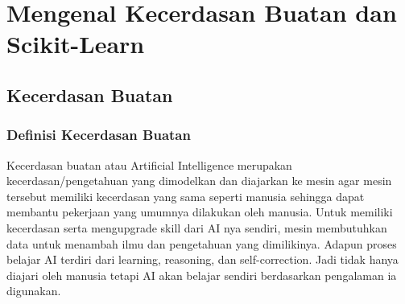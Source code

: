 \chapter{Mengenal Kecerdasan Buatan dan Scikit-Learn}

\section{Kecerdasan Buatan}
\subsection{Definisi Kecerdasan Buatan}
\par
Kecerdasan buatan atau Artificial Intelligence merupakan kecerdasan/pengetahuan yang dimodelkan dan diajarkan ke mesin agar mesin tersebut memiliki kecerdasan yang sama seperti manusia sehingga dapat membantu pekerjaan yang umumnya dilakukan oleh manusia. Untuk memiliki kecerdasan serta mengupgrade skill dari AI nya sendiri, mesin membutuhkan data untuk menambah ilmu dan pengetahuan yang dimilikinya. Adapun proses belajar AI terdiri dari learning, reasoning, dan self-correction. Jadi tidak hanya diajari oleh manusia tetapi AI akan belajar sendiri berdasarkan pengalaman ia digunakan.
